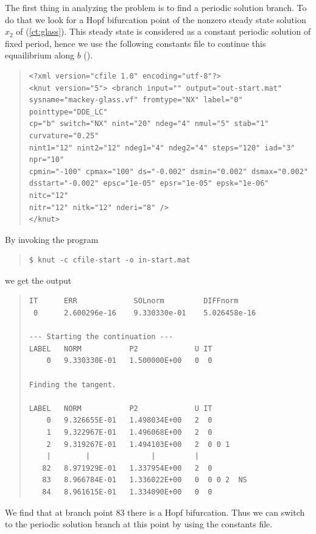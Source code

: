 \documentclass[10pt,a4paper]{ddedoc}
\begin{document}
The first thing in analyzing the problem is to find a periodic solution
branch. To do that we look for a Hopf bifurcation point of the nonzero steady state solution
$x_2$ of (\ref{ct:glass}). This steady state is considered as a constant periodic solution of
fixed period, hence we use the following constants file to continue this equailibrium along $b$ ().
{ \small \begin{quote} \begin{lstlisting}[basicstyle=\tt,frame=single]
<?xml version="cfile 1.0" encoding="utf-8"?>
<knut version="5"> <branch input="" output="out-start.mat"
sysname="mackey-glass.vf" fromtype="NX" label="0" pointtype="DDE_LC"
cp="b" switch="NX" nint="20" ndeg="4" nmul="5" stab="1" curvature="0.25"
nint1="12" nint2="12" ndeg1="4" ndeg2="4" steps="120" iad="3" npr="10"
cpmin="-100" cpmax="100" ds="-0.002" dsmin="0.002" dsmax="0.002"
dsstart="-0.002" epsc="1e-05" epsr="1e-05" epsk="1e-06" nitc="12"
nitr="12" nitk="12" nderi="8" />
</knut>
\end{lstlisting} \end{quote} } \noindent
By invoking the program
{ \small \begin{quote} \begin{lstlisting}[basicstyle=\tt,frame=single]
$ knut -c cfile-start -o in-start.mat
\end{lstlisting} \end{quote} } \noindent
we get the output
{ \small \begin{quote} \begin{lstlisting}[basicstyle=\tt,frame=single]
IT      ERR             SOLnorm         DIFFnorm
 0      2.600296e-16    9.330330e-01    5.026458e-16

--- Starting the continuation ---
LABEL   NORM           P2             U IT
    0   9.330330E-01   1.500000E+00   0  0

Finding the tangent.

LABEL   NORM           P2             U IT
    0   9.326655E-01   1.498034E+00   2  0
    1   9.322967E-01   1.496068E+00   2  0
    2   9.319267E-01   1.494103E+00   2  0 0 1
    |        |              |         |
   82   8.971929E-01   1.337954E+00   2  0
   83   8.966784E-01   1.336022E+00   0  0 0 2  NS
   84   8.961615E-01   1.334090E+00   0  0
\end{lstlisting} \end{quote} } \noindent
We find that at branch point 83 there is a Hopf bifurcation. Thus we can switch to the periodic solution branch at this point
by using the constants file.
\end{document}
